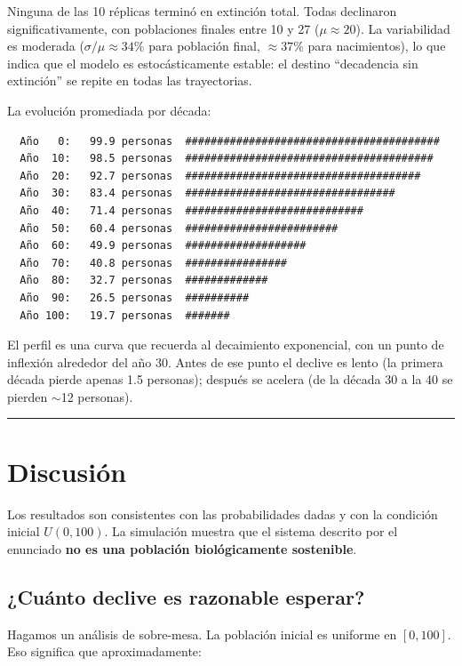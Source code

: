 \documentclass[12pt,a4paper]{article}
\begin{document}
Ninguna de las 10 réplicas terminó en extinción total. Todas declinaron significativamente, con poblaciones finales entre 10 y 27 ($\mu \approx 20$). La variabilidad es moderada ($\sigma/\mu \approx 34\%$ para población final, $\approx 37\%$ para nacimientos), lo que indica que el modelo es estocásticamente estable: el destino ``decadencia sin extinción'' se repite en todas las trayectorias.

La evolución promediada por década:

\begin{lstlisting}
  Año   0:   99.9 personas  ########################################
  Año  10:   98.5 personas  #######################################
  Año  20:   92.7 personas  #####################################
  Año  30:   83.4 personas  #################################
  Año  40:   71.4 personas  ############################
  Año  50:   60.4 personas  ########################
  Año  60:   49.9 personas  ###################
  Año  70:   40.8 personas  ################
  Año  80:   32.7 personas  #############
  Año  90:   26.5 personas  ##########
  Año 100:   19.7 personas  #######
\end{lstlisting}

El perfil es una curva que recuerda al decaimiento exponencial, con un punto de inflexión alrededor del año 30. Antes de ese punto el declive es lento (la primera década pierde apenas 1.5 personas); después se acelera (de la década 30 a la 40 se pierden $\sim$12 personas).

\begin{center}\rule{0.7\linewidth}{0.4pt}\end{center}

\section{Discusión}

Los resultados son consistentes con las probabilidades dadas y con la condición inicial $U(0, 100)$. La simulación muestra que el sistema descrito por el enunciado \textbf{no es una población biológicamente sostenible}.

\subsection{¿Cuánto declive es razonable esperar?}

Hagamos un análisis de sobre-mesa. La población inicial es uniforme en $[0, 100]$. Eso significa que aproximadamente:
\end{document}
